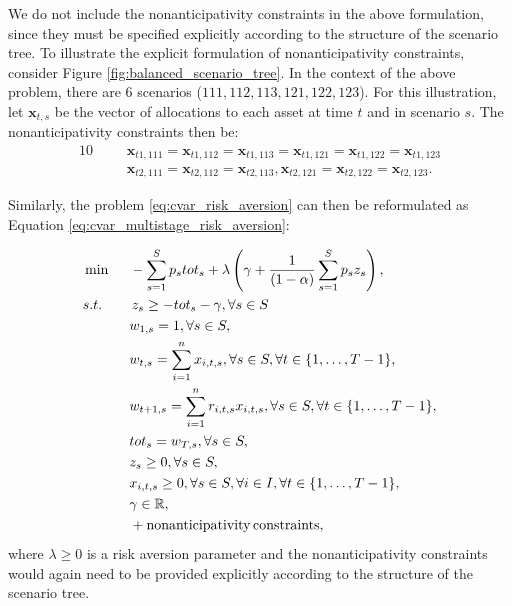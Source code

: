 \begin{rem}
We do not include the nonanticipativity constraints in the above formulation, since they must be specified explicitly according to the structure of the scenario tree. To illustrate the explicit formulation of nonanticipativity constraints, consider Figure \ref{fig:balanced_scenario_tree}. In the context of the above problem, there are 6 scenarios ($111, 112, 113, 121, 122, 123$). For this illustration, let $\mathbf{x}_{t,s}$ be the vector of allocations to each asset at time $t$ and in scenario $s$. The nonanticipativity constraints then be:
\begin{alignat}{10}
& && \mathbf{x}_{t1,111}=\mathbf{x}_{t1,112}=\mathbf{x}_{t1,113}=\mathbf{x}_{t1,121}=\mathbf{x}_{t1,122}=\mathbf{x}_{t1,123} \nonumber \\
& && \mathbf{x}_{t2,111}=\mathbf{x}_{t2,112}=\mathbf{x}_{t2,113},\mathbf{x}_{t2,121}=\mathbf{x}_{t2,122}=\mathbf{x}_{t2,123}. \nonumber
\end{alignat}
\end{rem}
Similarly, the problem \ref{eq:cvar_risk_aversion} can then be reformulated as Equation \ref{eq:cvar_multistage_risk_aversion}:

\begin{alignat}{10}
& \min  \, \, \, && - \sum_{s=1}^{S} p_s tot_s + \lambda \left( \gamma + \frac{1}{(1-\alpha)} \sum_{s=1}^S p_s z_s \right), \label{eq:cvar_multistage_risk_aversion}  \\
&s.t. && \, z_s \geq  -tot_s -\gamma, \forall s \in S \nonumber \\
& && w_{1,s}=1, \forall s \in S, \nonumber \\
& && w_{t,s}=\sum_{i=1}^{n} x_{i,t,s}, \forall s \in S, \forall t \in \{1,\dots ,T-1\}, \nonumber \\
& && w_{t+1,s}=\sum_{i=1}^{n} r_{i,t,s} x_{i,t,s}, \forall s \in S, \forall t \in \{1,\dots ,T-1\},  \nonumber \\
& && tot_s = w_{T,s}, \forall s \in S, \nonumber \\
& && z_s \geq 0, \forall s \in S, \nonumber \\
& && x_{i,t,s} \geq 0, \forall s \in S, \forall i \in I, \forall t \in \{1,\dots ,T-1\}, \nonumber \\
& && \gamma \in \R ,\nonumber \\
& && + \mathrm{nonanticipativity \, constraints}, \nonumber
\end{alignat}
where $\lambda \geq 0$ is a risk aversion parameter and the nonanticipativity constraints would again need to be provided explicitly according to the structure of the scenario tree.